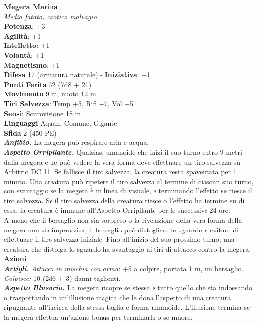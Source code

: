 \begin{multicols}{2}
\medskip\textbf{Megera Marina}\\
\emph{Media fatato, caotico malvagio}\\
\textbf{Potenza}: +3\\
\textbf{Agilità}: +1\\
\textbf{Intelletto}: +1\\
\textbf{Volontà}: +1\\
\textbf{Magnetismo}: +1\\
\textbf{Difesa} 17 (armatura naturale) - \textbf{Iniziativa}: +1\\
\textbf{Punti Ferita} 52 (7d8 + 21)\\
\textbf{Movimento} 9 m, nuoto 12 m\\
\textbf{Tiri Salvezza}: Temp +5, Rifl +7, Vol +5\\
\textbf{Sensi}: Scurovisione 18 m\\
\textbf{Linguaggi} Aquan, Comune, Gigante\\
\textbf{Sfida} 2 (450 PE)\smallskip\\
\emph{\textbf{Anfibio.}} La megera può respirare aria e acqua.\\
\emph{\textbf{Aspetto Orripilante.}} Qualsiasi umanoide che inizi il suo turno entro 9 metri dalla megera e ne può vedere la vera forma deve effettuare un tiro salvezza su Arbitrio DC 11. Se fallisce il tiro salvezza, la creatura resta spaventata per 1 minuto. Una creatura può ripetere il tiro salvezza al termine di ciascun suo turno, con svantaggio se la megera è in linea di visuale, e terminando l'effetto se riesce il tiro salvezza. Se il tiro salvezza della creatura riesce o l'effetto ha termine su di essa, la creatura è immune all'Aspetto Orripilante per le successive 24 ore.\\
A meno che il bersaglio non sia sorpreso o la rivelazione della vera forma della megera non sia improvvisa, il bersaglio può distogliere lo sguardo e evitare di effettuare il tiro salvezza iniziale. Fino all'inizio del suo prossimo turno, una creatura che distolga lo sguardo ha svantaggio ai tiri di attacco contro la megera.\\
\smallskip\textbf{Azioni}\\
\emph{\textbf{Artigli.} Attacco in mischia con arma}: +5 a colpire, portata 1 m, un bersaglio.\\
\emph{Colpisce:} 10 (2d6 + 3) danni taglienti.\\
\emph{\textbf{Aspetto Illusorio.}} La megera ricopre se stessa e tutto quello che sta indossando o trasportando in un'illusione magica che le dona l'aspetto di una creatura ripugnante all'incirca della stessa taglia e forma umanoide. L'illusione termina se la megera effettua un'azione bonus per terminarla o se muore.\\


\end{multicols}
